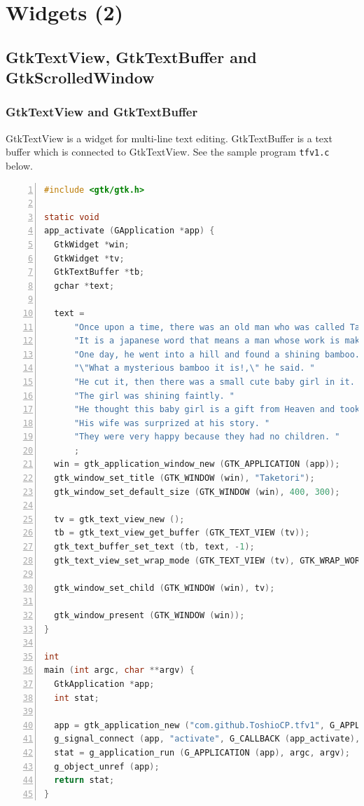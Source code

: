 \section{Widgets (2)}\label{widgets-2}

\subsection{GtkTextView, GtkTextBuffer and
GtkScrolledWindow}\label{gtktextview-gtktextbuffer-and-gtkscrolledwindow}

\subsubsection{GtkTextView and
GtkTextBuffer}\label{gtktextview-and-gtktextbuffer}

GtkTextView is a widget for multi-line text editing. GtkTextBuffer is a
text buffer which is connected to GtkTextView. See the sample program
\passthrough{\lstinline!tfv1.c!} below.

\begin{lstlisting}[language=C, numbers=left]
#include <gtk/gtk.h>

static void
app_activate (GApplication *app) {
  GtkWidget *win;
  GtkWidget *tv;
  GtkTextBuffer *tb;
  gchar *text;

  text =
      "Once upon a time, there was an old man who was called Taketori-no-Okina. "
      "It is a japanese word that means a man whose work is making bamboo baskets.\n"
      "One day, he went into a hill and found a shining bamboo. "
      "\"What a mysterious bamboo it is!,\" he said. "
      "He cut it, then there was a small cute baby girl in it. "
      "The girl was shining faintly. "
      "He thought this baby girl is a gift from Heaven and took her home.\n"
      "His wife was surprized at his story. "
      "They were very happy because they had no children. "
      ;
  win = gtk_application_window_new (GTK_APPLICATION (app));
  gtk_window_set_title (GTK_WINDOW (win), "Taketori");
  gtk_window_set_default_size (GTK_WINDOW (win), 400, 300);

  tv = gtk_text_view_new ();
  tb = gtk_text_view_get_buffer (GTK_TEXT_VIEW (tv));
  gtk_text_buffer_set_text (tb, text, -1);
  gtk_text_view_set_wrap_mode (GTK_TEXT_VIEW (tv), GTK_WRAP_WORD_CHAR);

  gtk_window_set_child (GTK_WINDOW (win), tv);

  gtk_window_present (GTK_WINDOW (win));
}

int
main (int argc, char **argv) {
  GtkApplication *app;
  int stat;

  app = gtk_application_new ("com.github.ToshioCP.tfv1", G_APPLICATION_DEFAULT_FLAGS);
  g_signal_connect (app, "activate", G_CALLBACK (app_activate), NULL);
  stat = g_application_run (G_APPLICATION (app), argc, argv);
  g_object_unref (app);
  return stat;
}
\end{lstlisting}

